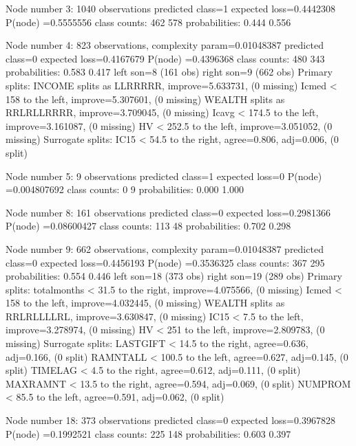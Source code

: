 \documentclass{article}
\begin{document}
\begin{Schunk}
\begin{Soutput}
Node number 3: 1040 observations
  predicted class=1  expected loss=0.4442308  P(node) =0.5555556
    class counts:   462   578
   probabilities: 0.444 0.556 

Node number 4: 823 observations,    complexity param=0.01048387
  predicted class=0  expected loss=0.4167679  P(node) =0.4396368
    class counts:   480   343
   probabilities: 0.583 0.417 
  left son=8 (161 obs) right son=9 (662 obs)
  Primary splits:
      INCOME splits as  LLRRRRR,      improve=5.633731, (0 missing)
      Icmed  < 158      to the left,  improve=5.307601, (0 missing)
      WEALTH splits as  RRLRLLRRRR,   improve=3.709045, (0 missing)
      Icavg  < 174.5    to the left,  improve=3.161087, (0 missing)
      HV     < 252.5    to the left,  improve=3.051052, (0 missing)
  Surrogate splits:
      IC15 < 54.5     to the right, agree=0.806, adj=0.006, (0 split)

Node number 5: 9 observations
  predicted class=1  expected loss=0  P(node) =0.004807692
    class counts:     0     9
   probabilities: 0.000 1.000 

Node number 8: 161 observations
  predicted class=0  expected loss=0.2981366  P(node) =0.08600427
    class counts:   113    48
   probabilities: 0.702 0.298 

Node number 9: 662 observations,    complexity param=0.01048387
  predicted class=0  expected loss=0.4456193  P(node) =0.3536325
    class counts:   367   295
   probabilities: 0.554 0.446 
  left son=18 (373 obs) right son=19 (289 obs)
  Primary splits:
      totalmonths < 31.5     to the right, improve=4.075566, (0 missing)
      Icmed       < 158      to the left,  improve=4.032445, (0 missing)
      WEALTH      splits as  RRLRLLLLRL,   improve=3.630847, (0 missing)
      IC15        < 7.5      to the left,  improve=3.278974, (0 missing)
      HV          < 251      to the left,  improve=2.809783, (0 missing)
  Surrogate splits:
      LASTGIFT < 14.5     to the right, agree=0.636, adj=0.166, (0 split)
      RAMNTALL < 100.5    to the left,  agree=0.627, adj=0.145, (0 split)
      TIMELAG  < 4.5      to the right, agree=0.612, adj=0.111, (0 split)
      MAXRAMNT < 13.5     to the right, agree=0.594, adj=0.069, (0 split)
      NUMPROM  < 85.5     to the left,  agree=0.591, adj=0.062, (0 split)

Node number 18: 373 observations
  predicted class=0  expected loss=0.3967828  P(node) =0.1992521
    class counts:   225   148
   probabilities: 0.603 0.397 


\end{Soutput}
\end{Schunk}
\end{document}
